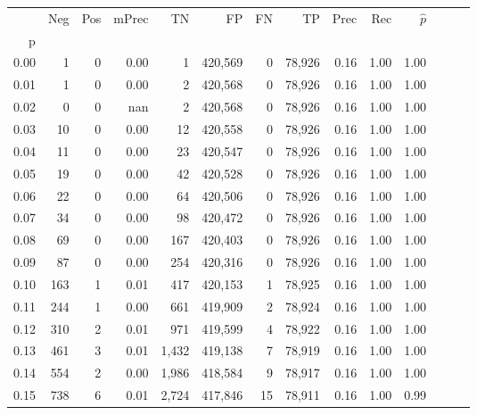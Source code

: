 \begin{tabular}{rrrrrrrrrrrrrr}
\toprule
{} &     Neg &    Pos & mPrec &       TN &       FP &      FN &      TP &  Prec &   Rec & $\hat{p}$ \\
p    &         &        &       &          &          &         &         &       &       &           \\
\midrule
0.00 &       1 &      0 &  0.00 &        1 &  420,569 &       0 &  78,926 &  0.16 &  1.00 &      1.00 \\
0.01 &       1 &      0 &  0.00 &        2 &  420,568 &       0 &  78,926 &  0.16 &  1.00 &      1.00 \\
0.02 &       0 &      0 &   nan &        2 &  420,568 &       0 &  78,926 &  0.16 &  1.00 &      1.00 \\
0.03 &      10 &      0 &  0.00 &       12 &  420,558 &       0 &  78,926 &  0.16 &  1.00 &      1.00 \\
0.04 &      11 &      0 &  0.00 &       23 &  420,547 &       0 &  78,926 &  0.16 &  1.00 &      1.00 \\
0.05 &      19 &      0 &  0.00 &       42 &  420,528 &       0 &  78,926 &  0.16 &  1.00 &      1.00 \\
0.06 &      22 &      0 &  0.00 &       64 &  420,506 &       0 &  78,926 &  0.16 &  1.00 &      1.00 \\
0.07 &      34 &      0 &  0.00 &       98 &  420,472 &       0 &  78,926 &  0.16 &  1.00 &      1.00 \\
0.08 &      69 &      0 &  0.00 &      167 &  420,403 &       0 &  78,926 &  0.16 &  1.00 &      1.00 \\
0.09 &      87 &      0 &  0.00 &      254 &  420,316 &       0 &  78,926 &  0.16 &  1.00 &      1.00 \\
0.10 &     163 &      1 &  0.01 &      417 &  420,153 &       1 &  78,925 &  0.16 &  1.00 &      1.00 \\
0.11 &     244 &      1 &  0.00 &      661 &  419,909 &       2 &  78,924 &  0.16 &  1.00 &      1.00 \\
0.12 &     310 &      2 &  0.01 &      971 &  419,599 &       4 &  78,922 &  0.16 &  1.00 &      1.00 \\
0.13 &     461 &      3 &  0.01 &    1,432 &  419,138 &       7 &  78,919 &  0.16 &  1.00 &      1.00 \\
0.14 &     554 &      2 &  0.00 &    1,986 &  418,584 &       9 &  78,917 &  0.16 &  1.00 &      1.00 \\
0.15 &     738 &      6 &  0.01 &    2,724 &  417,846 &      15 &  78,911 &  0.16 &  1.00 &      0.99 \\

\end{tabular}
